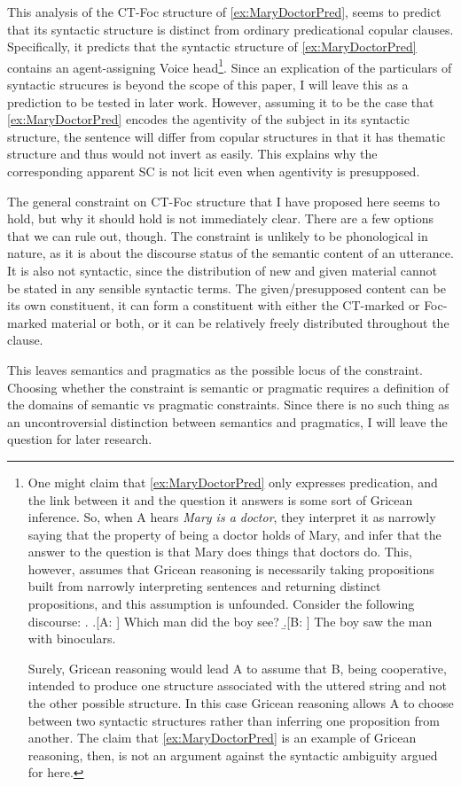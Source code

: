 \documentclass[GPFinal]{subfiles}
\begin{document}
This analysis of the CT-Foc structure of \ref{ex:MaryDoctorPred}, seems to predict that its syntactic structure is distinct from ordinary predicational copular clauses.
Specifically, it predicts that the syntactic structure of \ref{ex:MaryDoctorPred} contains an agent-assigning Voice head\footnote{
  One might claim that \ref{ex:MaryDoctorPred} only expresses predication, and the link between it and the question it answers is some sort of Gricean inference.
  So, when A hears \textit{Mary is a doctor}, they interpret it as narrowly saying that the property of being a doctor holds of Mary, and infer that the answer to the question is that Mary does things that doctors do.
  This, however, assumes that Gricean reasoning is necessarily taking propositions built from narrowly interpreting sentences and returning distinct propositions, and this assumption is unfounded.
  Consider the following discourse:
  \ex. 
  \a.[A: ] Which man did the boy see?
  \b.[B: ] The boy saw the man with binoculars.

  Surely, Gricean reasoning would lead A to assume that B, being cooperative, intended to produce one structure associated with the uttered string and not the other possible structure.
  In this case Gricean reasoning allows A to choose between two syntactic structures rather than inferring one proposition from another.
  The claim that \ref{ex:MaryDoctorPred} is an example of Gricean reasoning, then, is not an argument against the syntactic ambiguity argued for here.
}.
Since an explication of the particulars of syntactic strucures is beyond the scope of this paper, I will leave this as a prediction to be tested in later work.
However, assuming it to be the case that \ref{ex:MaryDoctorPred} encodes the agentivity of the subject in its syntactic structure, the sentence will differ from copular structures in that it has thematic structure and thus would not invert as easily.
This explains why the corresponding apparent SC is not licit even when agentivity is presupposed.

The general constraint on CT-Foc structure that I have proposed here seems to hold, but why it should hold is not immediately clear.
There are a few options that we can rule out, though.
The constraint is unlikely to be phonological in nature, as it is about the discourse status of the semantic content of an utterance.
It is also not syntactic, since the distribution of new and given material cannot be stated in any sensible syntactic terms.
The given/presupposed content can be its own constituent, it can form a constituent with either the CT-marked or Foc-marked material or both, or it can be relatively freely distributed throughout the clause.

This leaves semantics and pragmatics as the possible locus of the constraint.
Choosing whether the constraint is semantic or pragmatic requires a definition of the domains of semantic vs pragmatic constraints.
Since there is no such thing as an uncontroversial distinction between semantics and pragmatics, I will leave the question for later research.
\end{document}
